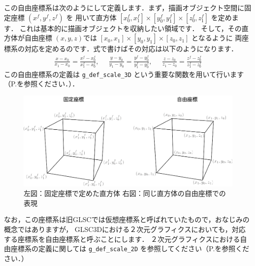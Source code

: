 \documentclass[platex,a4paper,12pt]{jsarticle}%
\begin{document}
この自由座標系は次のようにして定義します．まず，描画オブジェクト空間に固定座標 $(x^{f}, y^{f}, z^{f})$ を
用いて直方体  $[x_{0}^{f}, x_{1}^{f}] \times[y_{0}^{f}, y_{1}^{f}] \times [z_{0}^{f}, z_{1}^{f}] $ を定めます．
これは基本的に描画オブジェクトを収納したい領域です．
そして，その直方体が自由座標 $(x, y, z)$では $[x_{0}, x_{1}] \times [y_{0}, y_{1}] \times [z_{0}, z_{1}] $ となるように
両座標系の対応を定めるのです．式で書けばその対応は以下のようになります．
\begin{eqnarray*}
	\frac{x - x_{0}}{x_{1} - x_{0}} = \frac{x^{f} - x^{f}_{0}}{ x^{f}_{1} - x^{f}_{0}}, \;\;\;\;\;
	\frac{y - y_{0}}{ y_{1} - y_{0}} = \frac{y^{f} - y^{f}_{0}}{ y^{f}_{1} - y^{f}_{0}}, \;\;\;\;\;
	\frac{z - z_{0}}{z_{1} - z_{0}} = \frac{z^{f} - z^{f}_{0}}{ z^{f}_{1} - z^{f}_{0}}
\end{eqnarray*}
この自由座標系の定義は \verb|g_def_scale_3D| という重要な関数を用いて行います（P.\pageref{g_def_scale_3D}を参照ください．）．

\begin{figure}[htb]
\centering
\includegraphics[width=120mm]{Def_Scale.eps}
\caption{\small{左図：固定座標で定めた直方体\hspace{5mm} 右図：同じ直方体の自由座標での表現}}
\end{figure}

なお，この座標系は旧GLSCでは仮想座標系と呼ばれていたもので，おなじみの概念ではありますが，
GLSC3Dにおける２次元グラフィクスにおいても，対応する座標系を自由座標系と呼ぶことにします．
２次元グラフィクスにおける自由座標系の定義に関しては  \verb|g_def_scale_2D| を参照してください（P.\pageref{g_def_scale_2D}を参照ください．）\\

\end{document}
